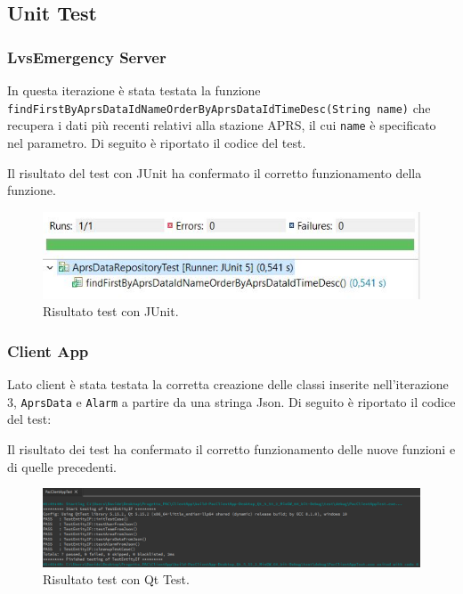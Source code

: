 \clearpage

\subsection{Unit Test}
\subsubsection{LvsEmergency Server}
In questa iterazione è stata testata la funzione \texttt{findFirstByAprsDataIdNameOrderByAprsDataIdTimeDesc(String name)} che recupera i dati più recenti relativi alla stazione APRS, il cui \texttt{name} è specificato nel parametro. Di seguito è riportato il codice del test.



Il risultato del test con JUnit ha confermato il corretto funzionamento della funzione.

\begin{figure}[h!]
	\centering
	\includegraphics[width=0.6\linewidth]{./Iterazione 3/ImageFiles/TestJUnit}
	\caption{Risultato test con JUnit.}
	\label{fig:RisultatiTestJunitIT3}
\end{figure}

\clearpage

\subsubsection{Client App}
Lato client è stata testata la corretta creazione delle classi inserite nell'iterazione 3, \texttt{AprsData} e \texttt{Alarm} a partire da una stringa Json. Di seguito è riportato il codice del test: 



Il risultato dei test ha confermato il corretto funzionamento delle nuove funzioni e di quelle precedenti. 

\begin{figure}[h!]
	\centering
	\includegraphics[width=1\linewidth]{./Iterazione 3/ImageFiles/testQt}
	\caption{Risultato test con Qt Test.}
	\label{fig:RisultatiTestQtIT3}
\end{figure}
\clearpage

